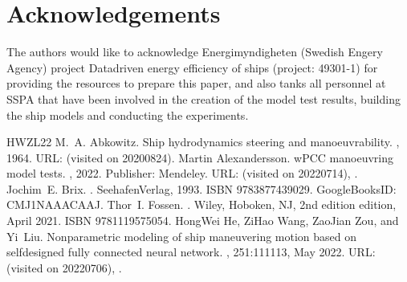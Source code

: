 \documentclass[review]{elsarticle}
\begin{document}
\section{Acknowledgements}
\label{\detokenize{acknowledgements:acknowledgements}}\label{\detokenize{acknowledgements::doc}}
\sphinxAtStartPar
The authors would like to acknowledge Energimyndigheten (Swedish Engery Agency) project Data\sphinxhyphen{}driven energy efficiency of ships (project: 49301-1) for providing the resources to prepare this paper, and also tanks all personnel at SSPA that have been involved in the creation of the model test results, building the ship models and conducting the experiments.

\sphinxAtStartPar


\begin{sphinxthebibliography}{HWZL22}
\sphinxAtStartPar
M. A. Abkowitz. Ship hydrodynamics \sphinxhyphen{} steering and manoeuvrability. , 1964. URL:  (visited on 2020\sphinxhyphen{}08\sphinxhyphen{}24).
\sphinxAtStartPar
Martin Alexandersson. wPCC manoeuvring model tests. , 2022. Publisher: Mendeley. URL:  (visited on 2022\sphinxhyphen{}07\sphinxhyphen{}14), .
\sphinxAtStartPar
Jochim E. Brix. . Seehafen\sphinxhyphen{}Verlag, 1993. ISBN 978\sphinxhyphen{}3\sphinxhyphen{}87743\sphinxhyphen{}902\sphinxhyphen{}9. Google\sphinxhyphen{}Books\sphinxhyphen{}ID: CMJ1NAAACAAJ.
\sphinxAtStartPar
Thor I. Fossen. . Wiley, Hoboken, NJ, 2nd edition edition, April 2021. ISBN 978\sphinxhyphen{}1\sphinxhyphen{}119\sphinxhyphen{}57505\sphinxhyphen{}4.
\sphinxAtStartPar
Hong\sphinxhyphen{}Wei He, Zi\sphinxhyphen{}Hao Wang, Zao\sphinxhyphen{}Jian Zou, and Yi Liu. Nonparametric modeling of ship maneuvering motion based on self\sphinxhyphen{}designed fully connected neural network. , 251:111113, May 2022. URL:  (visited on 2022\sphinxhyphen{}07\sphinxhyphen{}06), .

\end{sphinxthebibliography}
\end{document}
